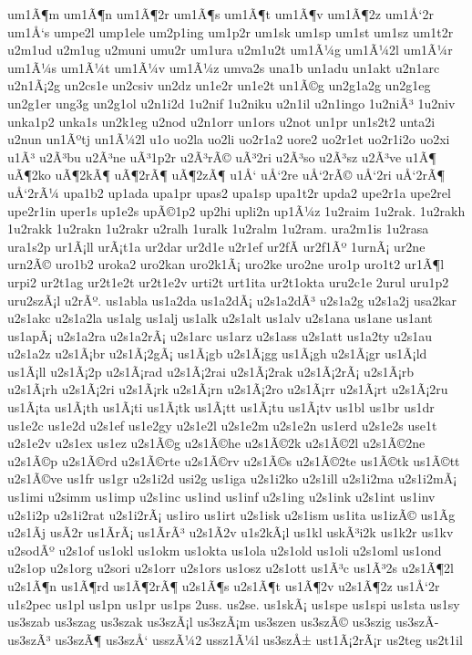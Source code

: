 {um1Ã¶m
um1Ã¶n
um1Ã¶2r
um1Ã¶s
um1Ã¶t
um1Ã¶v
um1Ã¶2z
um1Å‘2r
um1Å‘s
umpe2l
ump1ele
um2p1ing
um1p2r
um1sk
um1sp
um1st
um1sz
um1t2r
u2m1ud
u2m1ug
u2muni
umu2r
um1ura
u2m1u2t
um1Ã¼g
um1Ã¼2l
um1Ã¼r
um1Ã¼s
um1Ã¼t
um1Ã¼v
um1Ã¼z
umva2s
una1b
un1adu
un1akt
u2n1arc
u2n1Ã¡2g
un2cs1e
un2csiv
un2dz
un1e2r
un1e2t
un1Ã©g
un2g1a2g
un2g1eg
un2g1er
ung3g
un2g1ol
u2n1i2d
1u2nif
1u2niku
u2n1il
u2n1ingo
1u2niÃ³
1u2niv
unka1p2
unka1s
un2k1eg
u2nod
u2n1orr
un1ors
u2not
un1pr
un1s2t2
unta2i
u2nun
un1Ãºtj
un1Ã¼2l
u1o
uo2la
uo2li
uo2r1a2
uore2
uo2r1et
uo2r1i2o
uo2xi
u1Ã³
u2Ã³bu
u2Ã³ne
uÃ³1p2r
u2Ã³rÃ©
uÃ³2ri
u2Ã³so
u2Ã³sz
u2Ã³ve
u1Ã¶
uÃ¶2ko
uÃ¶2kÃ¶
uÃ¶2rÃ¶
uÃ¶2zÃ¶
u1Å‘
uÅ‘2re
uÅ‘2rÃ©
uÅ‘2ri
uÅ‘2rÃ¶
uÅ‘2rÃ¼
upa1b2
up1ada
upa1pr
upas2
upa1sp
upa1t2r
upda2
upe2r1a
upe2rel
upe2r1in
uper1s
up1e2s
upÃ©1p2
up2hi
upli2n
up1Ã¼z
1u2raim
1u2rak.
1u2rakh
1u2rakk
1u2rakn
1u2rakr
u2ralh
1uralk
1u2ralm
1u2ram.
ura2m1is
1u2rasa
ura1s2p
ur1Ã¡ll
urÃ¡t1a
ur2dar
ur2d1e
u2r1ef
ur2fÃ­
ur2f1Ãº
1urnÃ¡
ur2ne
urn2Ã©
uro1b2
uroka2
uro2kan
uro2k1Ã¡
uro2ke
uro2ne
uro1p
uro1t2
ur1Ã¶l
urpi2
ur2t1ag
ur2t1e2t
ur2t1e2v
urti2t
urt1ita
ur2t1okta
uru2c1e
2urul
uru1p2
uru2szÃ¡l
u2rÃº.
us1abla
us1a2da
us1a2dÃ¡
u2s1a2dÃ³
u2s1a2g
u2s1a2j
usa2kar
u2s1akc
u2s1a2la
us1alg
us1alj
us1alk
u2s1alt
us1alv
u2s1ana
us1ane
us1ant
us1apÃ¡
u2s1a2ra
u2s1a2rÃ¡
u2s1arc
us1arz
u2s1ass
u2s1att
us1a2ty
u2s1au
u2s1a2z
u2s1Ã¡br
u2s1Ã¡2gÃ¡
us1Ã¡gb
u2s1Ã¡gg
us1Ã¡gh
u2s1Ã¡gr
us1Ã¡ld
us1Ã¡ll
u2s1Ã¡2p
u2s1Ã¡rad
u2s1Ã¡2rai
u2s1Ã¡2rak
u2s1Ã¡2rÃ¡
u2s1Ã¡rb
u2s1Ã¡rh
u2s1Ã¡2ri
u2s1Ã¡rk
u2s1Ã¡rn
u2s1Ã¡2ro
u2s1Ã¡rr
u2s1Ã¡rt
u2s1Ã¡2ru
us1Ã¡ta
us1Ã¡th
us1Ã¡ti
us1Ã¡tk
us1Ã¡tt
us1Ã¡tu
us1Ã¡tv
us1bl
us1br
us1dr
us1e2c
us1e2d
u2s1ef
us1e2gy
u2s1e2l
u2s1e2m
u2s1e2n
us1erd
u2s1e2s
use1t
u2s1e2v
u2s1ex
us1ez
u2s1Ã©g
u2s1Ã©he
u2s1Ã©2k
u2s1Ã©2l
u2s1Ã©2ne
u2s1Ã©p
u2s1Ã©rd
u2s1Ã©rte
u2s1Ã©rv
u2s1Ã©s
u2s1Ã©2te
us1Ã©tk
us1Ã©tt
u2s1Ã©ve
us1fr
us1gr
u2s1i2d
usi2g
us1iga
u2s1i2ko
u2s1ill
u2s1i2ma
u2s1i2mÃ¡
us1imi
u2simm
us1imp
u2s1inc
us1ind
us1inf
u2s1ing
u2s1ink
u2s1int
us1inv
u2s1i2p
u2s1i2rat
u2s1i2rÃ¡
us1iro
us1irt
u2s1isk
u2s1ism
us1ita
us1izÃ©
us1Ã­g
u2s1Ã­j
usÃ­2r
us1Ã­rÃ¡
us1Ã­rÃ³
u2s1Ã­2v
u1s2kÃ¡l
us1kl
uskÃ³i2k
us1k2r
us1kv
u2sodÃº
u2s1of
us1okl
us1okm
us1okta
us1ola
u2s1old
us1oli
u2s1oml
us1ond
u2s1op
u2s1org
u2sori
u2s1orr
u2s1ors
us1osz
u2s1ott
us1Ã³c
us1Ã³2s
u2s1Ã¶2l
u2s1Ã¶n
us1Ã¶rd
us1Ã¶2rÃ¶
u2s1Ã¶s
u2s1Ã¶t
us1Ã¶2v
u2s1Ã¶2z
us1Å‘2r
u1s2pec
us1pl
us1pn
us1pr
us1ps
2uss.
us2se.
us1skÃ¡
us1spe
us1spi
us1sta
us1sy
us3szab
us3szag
us3szak
us3szÃ¡l
us3szÃ¡m
us3szen
us3szÃ©
us3szig
us3szÃ­
us3szÃ³
us3szÃ¶
us3szÅ‘
usszÃ¼2
ussz1Ã¼l
us3szÅ±
ust1Ã¡2rÃ¡r
us2teg
us2t1il
}
